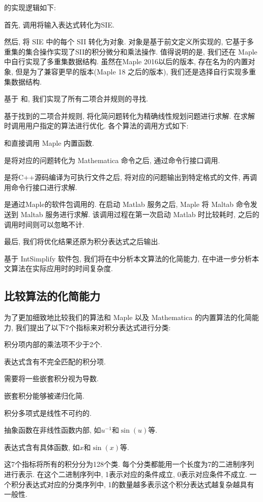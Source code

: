 的实现逻辑如下:
\begin{compactenum}[Step 1.]
\item 首先, 调用将输入表达式转化为SIE.
\item 然后, 将 SIE 中的每个 SII 转化为对象. 对象是基于前文定义所实现的, 它基于多重集的集合操作实现了SII的积分\D 微分和乘法操作. 值得说明的是, 我们还在 Maple 中自行实现了多重集数据结构. 虽然在Maple 2016以后的版本, 存在名为的内置对象, 但是为了兼容更早的版本(Maple 18 之后的版本), 我们还是选择自行实现多重集数据结构.
\item 基于\D {}\D {} 和, 我们实现了所有二项合并规则的寻找.
\item 基于找到的二项合并规则, 将化简问题转化为精确线性规划问题进行求解. 在求解时调用用户指定的算法进行优化. 各个算法的调用方式如下:
\begin{compactitem}[\textbullet]
\item {}和直接调用 Maple 内置函数.
\item {}是将对应的问题转化为 Mathematica 命令之后, 通过命令行接口调用.
\item {}是将C++源码编译为可执行文件之后, 将对应的问题输出到特定格式的文件, 再调用命令行接口进行求解.
\item {}是通过Maple的软件包调用的. 在启动 Matlab 服务之后, Maple 将 Maltab 命令发送到 Maltab 服务进行求解. 该调用过程在第一次启动 Matlab 时比较耗时, 之后的调用时间则可以忽略不计.
\end{compactitem}
\item 最后, 我们将优化结果还原为积分表达式之后输出.
\end{compactenum}

基于 IntSimplify 软件包, 我们将在中分析本文算法的化简能力, 在中进一步分析本文算法在实际应用时的时间复杂度. 

\subsection{比较算法的化简能力}\label{sec5.1-03}
为了更加细致地比较我们的算法和 Maple 以及 Mathematica 的内置算法的化简能力, 我们提出了以下7个指标来对积分表达式进行分类:
\begin{compactenum}[(1) ]
\item 积分项内部的乘法项不少于2个.
\item 表达式含有不完全匹配的积分项.
\item 需要将一些嵌套积分视为导数. 
\item 嵌套积分能够被递归化简.
\item 积分多项式是线性不可约的.
\item 抽象函数在非线性函数内部, 如$u^{-1}$和$\sin(u)$等.  
\item 表达式含有具体函数, 如$x$和$\sin(x)$等. 
\end{compactenum} 
这7个指标将所有的积分分为128个类. 每个分类都能用一个长度为7的二进制序列进行表示. 在这个二进制序列中, 1表示对应的条件成立, 0表示对应条件不成立. 一个积分表达式对应的分类序列中, 1的数量越多表示这个积分表达式越复杂\D 越具有一般性. 

